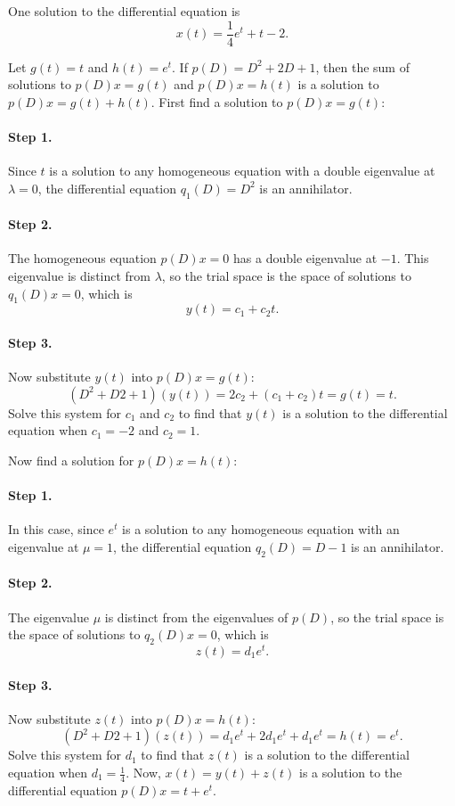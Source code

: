 \documentclass{ximera}
\begin{document}
 \ans One solution to the differential equation is
\[
x(t) = \frac{1}{4}e^t + t - 2.
\]

\soln Let $g(t) = t$ and $h(t) = e^t$.  If $p(D) = D^2 + 2D + 1$, then the
sum of solutions to $p(D)x = g(t)$ and $p(D)x = h(t)$ is a solution to
$p(D)x = g(t) + h(t)$.  First find a solution to $p(D)x = g(t)$:

\paragraph{Step 1.} Since $t$ is a solution to any homogeneous equation
with a double eigenvalue at $\lambda = 0$, the differential equation
$q_1(D) = D^2$ is an annihilator.

\paragraph{Step 2.} The homogeneous equation $p(D)x = 0$ has a double
eigenvalue at $-1$.  This eigenvalue is distinct from $\lambda$, so
the trial space is the space of solutions to $q_1(D)x = 0$, which is
\[
y(t) = c_1 + c_2t.
\]
\paragraph{Step 3.} Now substitute $y(t)$ into $p(D)x = g(t)$:
\[
(D^2 + D2 + 1)(y(t)) = 2c_2 + (c_1 + c_2)t = g(t) = t.
\]
Solve this system for $c_1$ and $c_2$ to find that $y(t)$ is a solution to
the differential equation when $c_1 = -2$ and $c_2 = 1$.

\para Now find a solution for $p(D)x = h(t)$:

\paragraph{Step 1.} In this case, since $e^t$ is a solution to any
homogeneous equation with an eigenvalue at $\mu = 1$, the differential
equation $q_2(D) = D - 1$ is an annihilator.

\paragraph{Step 2.} The eigenvalue $\mu$ is distinct from the eigenvalues
of $p(D)$, so the trial space is the space of solutions to $q_2(D)x =
0$, which is
\[
z(t) = d_1e^t.
\]
\paragraph{Step 3.} Now substitute $z(t)$ into $p(D)x = h(t)$:
\[
(D^2 + D2 + 1)(z(t)) = d_1e^t + 2d_1e^t + d_1e^t = h(t) = e^t.
\]
Solve this system for $d_1$ to find that $z(t)$ is a solution to
the differential equation when $d_1 = \frac{1}{4}$.  Now, $x(t) = y(t) + z(t)$
is a solution to the differential equation $p(D)x = t + e^t$.
\end{document}
